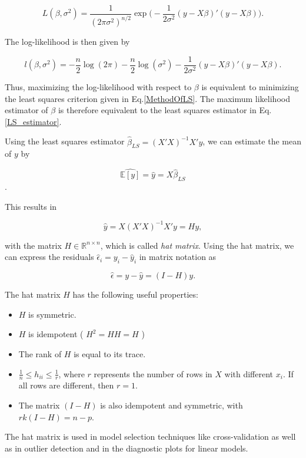 $$L(\beta, \sigma^2) = \frac{1}{(2\pi\sigma^2)^{n/2}} \exp \Big( -\frac{1}{2\sigma^2}(y - X\beta)'(y - X\beta) \Big).$$

The log-likelihood is then given by

$$l(\beta, \sigma^2) = -\frac{n}{2}\log(2\pi) - \frac{n}{2}\log(\sigma^2) - \frac{1}{2\sigma^2}(y - X\beta)'(y - X\beta).$$

Thus, maximizing the log-likelihood with respect to $\beta$ is equivalent to minimizing the least squares criterion given in Eq.\ref{MethodOfLS}. The maximum likelihood estimator of $\beta$ is therefore equivalent to the least squares estimator in Eq.\ref{LS_estimator}.


Using the least squares estimator $\hat \beta_{LS} = (X'X)^{-1}X'y$, we can estimate the mean of $y$ by 

$$\widehat{\mathbb{E}[y]} = \hat y = X\hat\beta_{LS}$$. 

This results in 

\begin{equation} \label{HatMatrix}
	\hat y = X(X'X)^{-1}X'y = Hy,
\end{equation}

with the matrix $H \in \mathbb{R}^{n \times n}$, which is called \emph{hat matrix}. Using the hat matrix, we can express the residuals $\hat \epsilon_i = y_i - \hat y_i$ in matrix notation as

$$\hat \epsilon = y - \hat y = (I - H) y.$$

The hat matrix $H$ has the following useful properties:

\begin{itemize}
\item  $H$ is symmetric.
\item $H$ is idempotent ( $H^2 = HH = H$ )
\item The rank of $H$ is equal to its trace.
\item $\frac{1}{n} \le h_{ii} \le \frac{1}{r}$, where $r$ represents the number of rows in $X$ with different $x_i$. If all rows are different, then $r = 1$.
\item The matrix $(I - H)$ is also idempotent and symmetric, with $rk(I - H) = n-p$.
\end{itemize}

The hat matrix is used in model selection techniques like cross-validation as well as in outlier detection and in the diagnostic plots for linear models.

